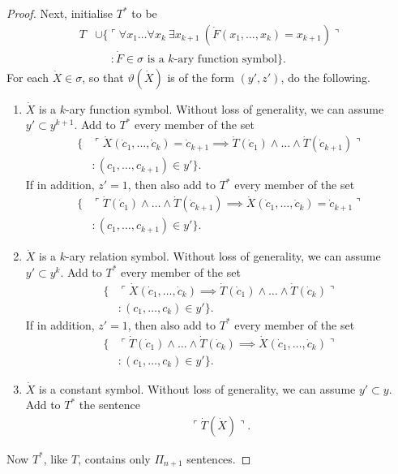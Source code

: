 \documentclass[12pt, twoside]{memoir}
\numberwithin{equation}{section}
\theoremstyle{definition}
\theoremstyle{remark}
\theoremstyle{definition}
\theoremstyle{definition}
\theoremstyle{definition}
\theoremstyle{remark}
\begin{document}
\begin{proof}
Next, initialise $T^*$ to be 
\begin{align*}
    T & \cup \{\ulcorner \forall x_1 \dots \forall x_k \ \exists x_{k+1} \ (\dot{F}(x_1, \dots, x_k) = x_{k+1}) \urcorner \\
    & \mspace{25mu} : \dot{F} \in \sigma \text{ is a } k \text{-ary function symbol}\} \text{.}
\end{align*}
For each $\dot{X} \in \sigma$, so that $\vartheta(\dot{X})$ is of the form $(y', z')$, do the following.
\begin{enumerate}[label=Case (\arabic*)$_{\dot{X}}$:, leftmargin=70pt]
    \item $\dot{X}$ is a $k$-ary function symbol. Without loss of generality, we can assume $y' \subset y^{k+1}$. Add to $T^*$ every member of the set
    \begin{align*}
        \{ & \ulcorner \dot{X}(\dot{c}_1, \ldots, \dot{c}_k) = \dot{c}_{k+1} \implies \dot{T}(\dot{c}_1) \wedge \ldots \wedge \dot{T}(\dot{c}_{k+1}) \urcorner \\
        & : (c_1, \ldots, c_{k+1}) \in y'\} \text{.}
    \end{align*}
    If in addition, $z' = 1$, then also add to $T^*$ every member of the set
    \begin{align*}
        \{ & \ulcorner \dot{T}(\dot{c}_1) \wedge \ldots \wedge \dot{T}(\dot{c}_{k+1}) \implies \dot{X}(\dot{c}_1, \ldots, \dot{c}_k) = \dot{c}_{k+1} \urcorner \\
        & : (c_1, \ldots, c_{k+1}) \in y'\} \text{.}
    \end{align*}
    \item $\dot{X}$ is a $k$-ary relation symbol. Without loss of generality, we can assume $y' \subset y^k$. Add to $T^*$ every member of the set
    \begin{align*}
        \{ & \ulcorner \dot{X}(\dot{c}_1, \ldots, \dot{c}_k) \implies \dot{T}(\dot{c}_1) \wedge \ldots \wedge \dot{T}(\dot{c}_k) \urcorner \\
        & : (c_1, \ldots, c_k) \in y'\} \text{.}
    \end{align*}
    If in addition, $z' = 1$, then also add to $T^*$ every member of the set
    \begin{align*}
        \{ & \ulcorner \dot{T}(\dot{c}_1) \wedge \ldots \wedge \dot{T}(\dot{c}_k) \implies \dot{X}(\dot{c}_1, \ldots, \dot{c}_k) \urcorner \\
        & : (c_1, \ldots, c_k) \in y'\} \text{.}
    \end{align*}
    \item $\dot{X}$ is a constant symbol. Without loss of generality, we can assume $y' \subset y$. Add to $T^*$ the sentence
    \begin{align*}
        \ulcorner \dot{T}(\dot{X}) \urcorner \text{.}
    \end{align*}
\end{enumerate}
Now $T^*$, like $T$, contains only $\Pi_{n+1}$ sentences.


\end{proof}
\end{document}
